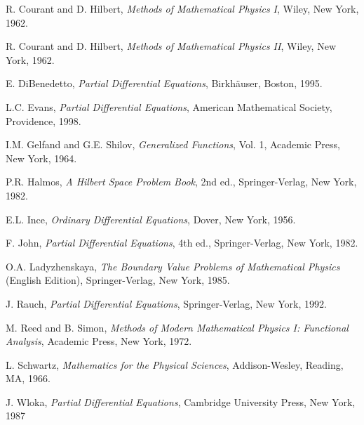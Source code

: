 \begin{list}{}{\setlength{\labelwidth}{3em}\setlength{\leftmargin}{4em}\setlength{\labelsep}{.8em}}
\item[{[CH1]}] R. Courant and D. Hilbert, \emph{Methods of Mathematical Physics I}, Wiley, New York, 1962.

\item[{[CH2]}] R. Courant and D. Hilbert, \emph{Methods of Mathematical Physics II}, Wiley, New York, 1962.

\item[{[DiB]}] E. DiBenedetto, \emph{Partial Differential Equations}, Birkhäuser, Boston, 1995.

\item[{[Eva]}] L.C. Evans, \emph{Partial Differential Equations}, American Mathematical Society, Providence, 1998.

\item[{[GS]}] I.M. Gelfand and G.E. Shilov, \emph{Generalized Functions}, Vol. 1, Academic Press, New York, 1964.

\item[{[Ha]}] P.R. Halmos, \emph{A Hilbert Space Problem Book}, 2nd ed., Springer-Verlag, New York, 1982.

\item[{[In]}] E.L. Ince, \emph{Ordinary Differential Equations}, Dover, New York, 1956.

\item[{[Jo]}] F. John, \emph{Partial Differential Equations}, 4th ed., Springer-Verlag, New York, 1982.

\item[{[La]}] O.A. Ladyzhenskaya, \emph{The Boundary Value Problems of Mathematical Physics} (English Edition), Springer-Verlag, New York, 1985.

\item[{[Rau]}] J. Rauch, \emph{Partial Differential Equations}, Springer-Verlag, New York, 1992.

\item[{[RS]}] M. Reed and B. Simon, \emph{Methods of Modern Mathematical Physics I: Functional Analysis}, Academic Press, New York, 1972.

\item[{[Sc]}] L. Schwartz, \emph{Mathematics for the Physical Sciences}, Addison-Wesley, Reading, MA, 1966.

\item[{[Wlok]}] J. Wloka, \emph{Partial Differential Equations}, Cambridge University Press, New York, 1987
\end{list}

